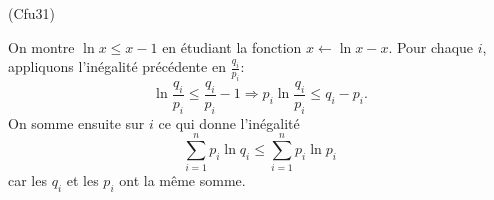 \begin{tiny}(Cfu31)\end{tiny} On montre $\ln x \leq x -1$ en étudiant la fonction $x \leftarrow \ln x -x$. Pour chaque $i$, appliquons l'inégalité précédente en $\frac{q_i}{p_i}$:
\[
  \ln \frac{q_i}{p_i} \leq \frac{q_i}{p_i} - 1
  \Rightarrow p_i \ln \frac{q_i}{p_i} \leq q_i - p_i.
\]
On somme ensuite sur $i$ ce qui donne l'inégalité 
\[
  \sum_{i=1}^n p_i\ln q_i \leq \sum_{i=1}^n p_i \ln p_i
\]
car les $q_i$ et les $p_i$ ont la même somme.
